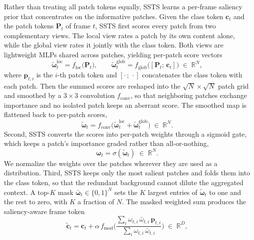 Rather than treating all patch tokens equally, SSTS learns a per-frame saliency prior that
concentrates on the informative patches.
Given the class token $\mathbf{c}_t$ and the patch tokens $\mathbf{P}_t$ of frame $t$, SSTS first
scores every patch from two complementary views.
The local view rates a patch by its own content alone, while the global view rates it jointly with
the class token.
Both views are lightweight MLPs shared across patches, yielding per-patch score vectors
\begin{equation}
  \tilde{\boldsymbol{\omega}}_t^{\mathrm{loc}} = f_{\mathrm{loc}}\!\big(\mathbf{P}_t\big),\qquad
  \tilde{\boldsymbol{\omega}}_t^{\mathrm{glob}} = f_{\mathrm{glob}}\!\big([\mathbf{P}_t;\,\mathbf{c}_t]\big)
  \;\in\;\mathbb{R}^{N},
\end{equation}
where $\mathbf{p}_{t,i}$ is the $i$-th patch token and $[\cdot\,;\,\cdot]$ concatenates the class
token with each patch.
Then the summed scores are reshaped into the $\sqrt{N}\times\sqrt{N}$ patch grid and smoothed by a
$3\times3$ convolution $f_{\mathrm{conv}}$, so that neighboring patches exchange importance
and no isolated patch keeps an aberrant score.
The smoothed map is flattened back to per-patch scores,
\begin{equation}
  \tilde{\boldsymbol{\omega}}_t = f_{\mathrm{conv}}\!\big(\tilde{\boldsymbol{\omega}}_t^{\mathrm{loc}} + \tilde{\boldsymbol{\omega}}_t^{\mathrm{glob}}\big)
  \;\in\;\mathbb{R}^{N}.
\end{equation}
Second, SSTS converts the scores into per-patch weights through a sigmoid gate, which keeps a
patch's importance graded rather than all-or-nothing,
\begin{equation}
  \boldsymbol{\omega}_t = \sigma(\tilde{\boldsymbol{\omega}}_t) \;\in\;\mathbb{R}^{N}.
\end{equation}
We normalize the weights over the patches wherever they are used as a distribution.
Third, SSTS keeps only the most salient patches and folds them into the class token, so that the
redundant background cannot dilute the aggregated context.
A top-$K$ mask
$\bar{\boldsymbol{\omega}}_t\in\{0,1\}^N$ sets the $K$ largest entries of
$\tilde{\boldsymbol{\omega}}_t$ to one and the rest to zero, with $K$ a fraction of $N$.
The masked weighted sum produces the saliency-aware frame token
\begin{equation}
  \tilde{\mathbf{c}}_t = \mathbf{c}_t + \alpha\, f_{\mathrm{mod}}\!\Big(
  \frac{\sum_i \omega_{t,i}\, \bar{\omega}_{t,i}\,\mathbf{p}_{t,i}}{\sum_i \omega_{t,i}\, \bar{\omega}_{t,i}}
  \Big) \;\in\;\mathbb{R}^{D},
\end{equation}
